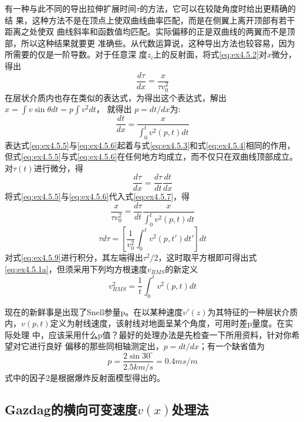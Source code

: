 有一种与此不同的导出拉伸扩展时间$\tau$的方法，它可以在较陡角度时给出更精确的结
果，这种方法不是在顶点上使双曲线曲率匹配，而是在侧翼上离开顶部有若干距离之处使双
曲线斜率和函数值均匹配。实际偏移的正是双曲线的两翼而不是顶部，所以这种结果就要更
准确些。从代数运算说，这种导出方法也较容易，因为所需要的仅是一阶导数。对于任意深
度$z_i$上的反射面，将式\ref{eq:ex4.5.2}对$x$微分，得出
\begin{equation}
\frac{d\tau}{dx}=\frac{x}{\tau v_0^2}
\label{eq:ex4.5.5}
\end{equation}
在层状介质内也存在类似的表达式，为得出这个表达式，解出$x=\int v\sin\theta dt=p\int v^2 dt$，
就得出
$p=dt/dx$为:
\begin{equation}
\frac{dt}{dx}=\frac{x}{\int_0^tv^2(p,t)dt}
\label{eq:ex4.5.6}
\end{equation}
表达式\ref{eq:ex4.5.5}与\ref{eq:ex4.5.6}起着与式\ref{eq:ex4.5.3}和式\ref{eq:ex4.5.4}相同的作用，但式\ref{eq:ex4.5.5}与式\ref{eq:ex4.5.6}在任何地方均成立，而不仅只在双曲线顶部成立。对$\tau(t)$进行微分，得
\begin{equation}
\frac{d\tau}{dx}=\frac{d\tau}{dt}\frac{dt}{dx}
\label{eq:ex4.5.7}
\end{equation}
将式\ref{eq:ex4.5.5}与\ref{eq:ex4.5.6}代入式\ref{eq:ex4.5.7}，得
\begin{equation}
\frac{x}{\tau v_0^2}=\frac{d\tau}{dt}\frac{x}{\int_0^tv^2(p,t)dt}
\label{eq:ex4.5.8}
\end{equation}
\begin{equation}
\tau d\tau=[\frac{1}{v_0^2}\int_0^tv^2(p,t')dt']dt
\label{eq:ex4.5.9}
\end{equation}
对式\ref{eq:ex4.5.9}进行积分，其左端得出$\tau^2/2$，这时取平方根即可得出式
\ref{eq:ex4.5.1a}，但须采用下列均方根速度$v_{RMS}$的新定义
\begin{equation}
v_{RMS}^2=\frac{1}{t}\int_0^tv^2(p,t)dt
\label{eq:ex4.5.1c}
\end{equation}

现在的新鲜事是出现了Snell参量p。在以某种速度$v'(z)$为其特征的一种层状介质
内，$v(p,t)$定义为射线速度，该射线对地面呈某个角度，可用时差p量度。在实际处理
中，应该采用什么p值？最好的处理办法是先检查一下所用资料，针对你希望对它进行良好
偏移的那些同相轴测定出，$p=dt/dx$；有一个缺省值为
\begin{equation*}
p=\frac{2\sin30^{\circ}}{2.5km/s}=0.4ms/m
\end{equation*}
式中的因子2是根据爆炸反射面模型得出的。

\subsection{Gazdag的横向可变速度$v(x)$处理法}
\label{sec:4.5.5}

